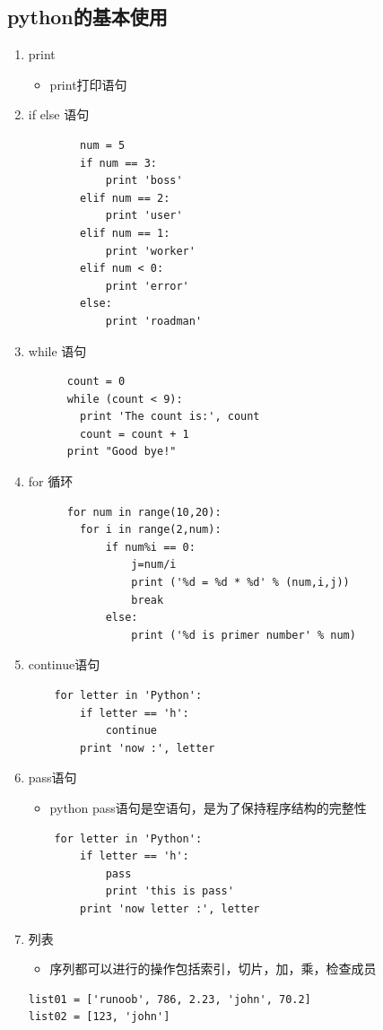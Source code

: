 \documentclass[a4paper, 12pt]{article}
\begin{document}
\subsection{python的基本使用}
\begin{enumerate}
\item{\large print}
  \begin{itemize}
    \item print打印语句
  \end{itemize}
\item{\large if else 语句}
      \begin{lstlisting}
        num = 5      
        if num == 3:            
            print 'boss'        
        elif num == 2:
            print 'user'
        elif num == 1:
            print 'worker'
        elif num < 0:           
            print 'error'
        else:
            print 'roadman'     
      \end{lstlisting}
\item{\large while 语句}
    \begin{lstlisting}
      count = 0
      while (count < 9):
        print 'The count is:', count
        count = count + 1
      print "Good bye!"
    \end{lstlisting}
\item {\large for 循环}
    \begin{lstlisting}
      for num in range(10,20):  
        for i in range(2,num): 
            if num%i == 0:      
                j=num/i          
                print ('%d = %d * %d' % (num,i,j))
                break            
            else:                  
                print ('%d is primer number' % num)
    \end{lstlisting}
\item {\large continue语句}
    \begin{lstlisting}
    for letter in 'Python':     
        if letter == 'h':
            continue
        print 'now :', letter
    \end{lstlisting}
\item {\large pass语句}
    \begin{itemize}
        \item python pass语句是空语句，是为了保持程序结构的完整性
    \end{itemize}
    \begin{lstlisting}
    for letter in 'Python':
        if letter == 'h':
            pass
            print 'this is pass'
        print 'now letter :', letter
    \end{lstlisting}
\item {\large 列表}
    \begin{itemize}
        \item 序列都可以进行的操作包括索引，切片，加，乘，检查成员
    \end{itemize}
    \begin{lstlisting}
list01 = ['runoob', 786, 2.23, 'john', 70.2]
list02 = [123, 'john']


\end{lstlisting}
\end{enumerate}
\end{document}
